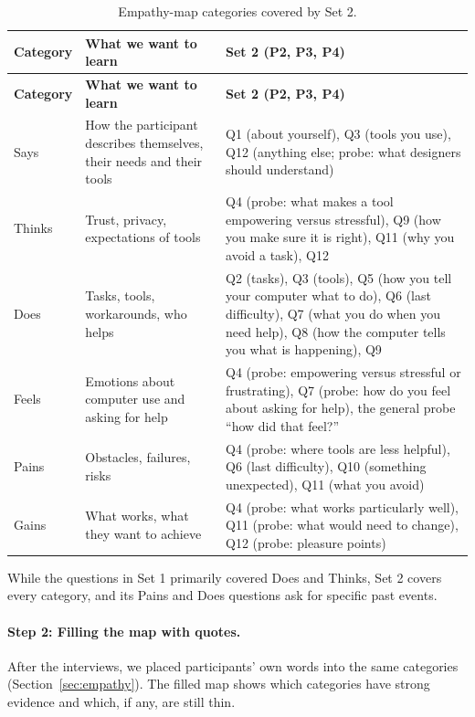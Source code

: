 \documentclass[12pt, titlepage]{article}
\begin{document}
{\small
\setlength{\tabcolsep}{4pt}
\begin{longtable}{>{\raggedright\arraybackslash}p{1.8cm} >{\raggedright\arraybackslash}p{4.6cm} >{\raggedright\arraybackslash}p{8.5cm}}
\caption{Empathy-map categories covered by Set 2.}\label{tab:qmap}\\
\toprule
\textbf{Category} & \textbf{What we want to learn} & \textbf{Set 2 (P2, P3, P4)}\\
\midrule
\endfirsthead
\toprule
\textbf{Category} & \textbf{What we want to learn} & \textbf{Set 2 (P2, P3, P4)}\\
\midrule
\endhead
\bottomrule
\endfoot
Says & How the participant describes themselves, their needs and their tools & Q1 (about yourself), Q3 (tools you use), Q12 (anything else; probe: what designers should understand)\\\addlinespace[3pt]
Thinks & Trust, privacy, expectations of tools & Q4 (probe: what makes a tool empowering versus stressful), Q9 (how you make sure it is right), Q11 (why you avoid a task), Q12\\\addlinespace[3pt]
Does & Tasks, tools, workarounds, who helps & Q2 (tasks), Q3 (tools), Q5 (how you tell your computer what to do), Q6 (last difficulty), Q7 (what you do when you need help), Q8 (how the computer tells you what is happening), Q9\\\addlinespace[3pt]
Feels & Emotions about computer use and asking for help & Q4 (probe: empowering versus stressful or frustrating), Q7 (probe: how do you feel about asking for help), the general probe ``how did that feel?''\\\addlinespace[3pt]
Pains & Obstacles, failures, risks & Q4 (probe: where tools are less helpful), Q6 (last difficulty), Q10 (something unexpected), Q11 (what you avoid)\\\addlinespace[3pt]
Gains & What works, what they want to achieve & Q4 (probe: what works particularly well), Q11 (probe: what would need to change), Q12 (probe: pleasure points)\\
\end{longtable}
}

While the questions in Set 1 primarily covered Does and Thinks, Set 2 covers every category, and its Pains and Does questions ask for specific past events.

\paragraph{Step 2: Filling the map with quotes.} After the interviews, we placed participants' own words into the same categories (Section~\ref{sec:empathy}). The filled map shows which categories have strong evidence and which, if any, are still thin.
\end{document}
